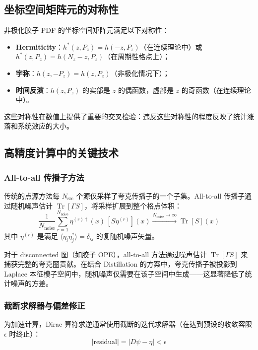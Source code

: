 \documentclass[11pt,a4paper]{ctexart}
\begin{document}
\subsection{坐标空间矩阵元的对称性}

非极化胶子 PDF 的坐标空间矩阵元满足以下对称性：
\begin{itemize}
  \item \textbf{Hermiticity}：$h^*(z, P_z) = h(-z, P_z)$（在连续理论中）或 $h^*(z, P_z) = h(N_z - z, P_z)$（在周期性格点上）；
  \item \textbf{宇称}：$h(z, -P_z) = h(z, P_z)$（非极化情况下）；
  \item \textbf{时间反演}：$h(z, P_z)$ 的实部是 $z$ 的偶函数，虚部是 $z$ 的奇函数（在连续理论中）。
\end{itemize}

这些对称性在数值上提供了重要的交叉检验：违反这些对称性的程度反映了统计涨落和系统效应的大小。

\subsection{高精度计算中的关键技术}

\subsubsection{All-to-all 传播子方法}

传统的点源方法每 $N_{\text{src}}$ 个源仅采样了夸克传播子的一个子集。All-to-all 传播子通过随机噪声估计 $\operatorname{Tr}[\Gamma S]$，将采样扩展到整个格点体积：
\begin{equation}
\frac{1}{N_{\text{noise}}} \sum_{r=1}^{N_{\text{noise}}} \eta^{(r)\dagger}(x) \, [S \eta^{(r)}](x) \xrightarrow{N_{\text{noise}} \to \infty} \operatorname{Tr}[S](x)
\end{equation}
其中 $\eta^{(r)}$ 是满足 $\langle \eta_i \eta_j^* \rangle = \delta_{ij}$ 的复随机噪声矢量。

对于 disconnected 图（如胶子 OPE），all-to-all 方法通过噪声估计 $\operatorname{Tr}[\Gamma S]$ 来捕获完整的夸克圈贡献。在结合 Distillation 的方案中，夸克传播子被投影到 Laplace 本征模子空间中，随机噪声仅需要在该子空间中生成——这显著降低了统计噪声的方差。

\subsubsection{截断求解器与偏差修正}

为加速计算，Dirac 算符求逆通常使用截断的迭代求解器（在达到预设的收敛容限 $\epsilon$ 时终止）：
\begin{equation}
|\text{residual}| = |D \psi - \eta| < \epsilon
\end{equation}
\end{document}
